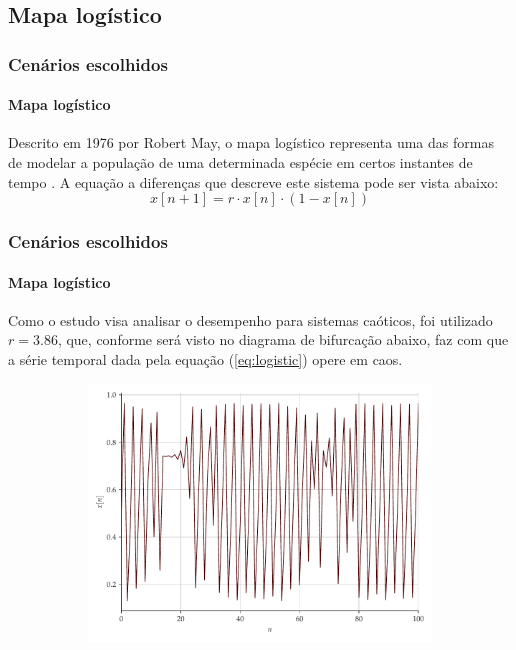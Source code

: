 \documentclass[aspectratio=169]{beamer}
\begin{document}
\subsection{Mapa logístico}
\begin{frame}
	\frametitle{Cenários escolhidos}
	\framesubtitle{Mapa logístico}
	\justifying Descrito em 1976 por Robert May, o mapa logístico representa uma das formas de modelar a população de uma determinada espécie em certos instantes de tempo \cite{may1976simple}. A equação a diferenças que descreve este sistema pode ser vista abaixo:
\begin{equation}\label{eq:logistic}
x[n+1] = r\cdot x[n] \cdot (1 - x[n])
\end{equation}
\end{frame}

\begin{frame}
	\frametitle{Cenários escolhidos}
	\framesubtitle{Mapa logístico}
\justifying Como o estudo visa analisar o desempenho para sistemas caóticos, foi utilizado $r=3.86$, que, conforme será visto no diagrama de bifurcação abaixo, faz com que a série temporal dada pela equação (\ref{eq:logistic}) opere em caos.
\begin{figure}[H]
     \begin{subfigure}[t]{0.3\textwidth} 
         \includegraphics[scale=0.2]{serie-logistico.pdf}
     \end{subfigure}
     \centering
     \begin{subfigure}[t]{0.3\textwidth} 

\end{subfigure}
\end{figure}
\end{frame}
\end{document}
